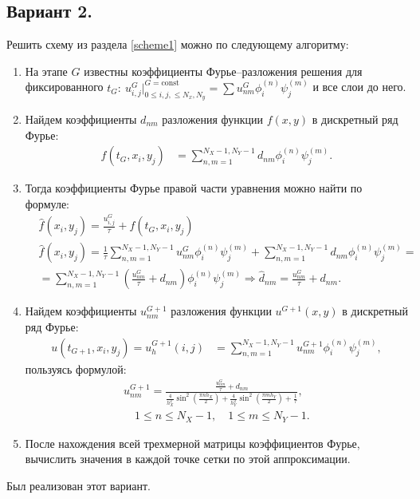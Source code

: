 \documentclass[14pt,a4paper]{extarticle}
\newcommand{\1}{\mathbbm{1}}
\begin{document}
\subsection{Вариант 2.}
Решить схему из раздела \ref{scheme1} можно по следующему алгоритму:
\begin{enumerate}
    \item На этапе $G$ известны коэффициенты Фурье--разложения решения для фиксированного $t_G: \ u_{i, j}^{G} \big|^{G = \text{const}} _{0 \leq i, j, \leq N_x, N_y} = \sum u_{nm}^G \phi ^{(n)}_i \psi ^{(m)}_j$ и все слои до него.
    \item Найдем коэффициенты $d_{nm}$ разложения функции $f(x, y)$ в дискретный ряд Фурье: 
    \begin{align*}
     f(t_G, x_i, y_j)  &= \sum_{n, m = 1}^{N_X-1, N_Y-1} d_{nm} \phi ^{(n)}_i \psi ^{(m)}_j.
    \end{align*}
    \item Тогда коэффициенты Фурье правой части уравнения можно найти по формуле:
    \begin{align*}
     &\hat f(x_i, y_j) = \frac{u^{G}_{i, j}}{\tau} + f(t_G, x_i, y_j) \\
     &\hat f(x_i, y_j) = \frac{1}{\tau} \sum_{n, m = 1}^{N_X-1, N_Y-1}u_{nm}^G \phi ^{(n)}_i \psi ^{(m)}_j  + \sum_{n, m = 1}^{N_X-1, N_Y-1} d_{nm} \phi ^{(n)}_i \psi ^{(m)}_j = \\
     &= \sum_{n, m = 1}^{N_X-1, N_Y-1} \left(\frac{u_{nm}^G}{\tau} + d_{nm}\right) \phi ^{(n)}_i \psi ^{(m)}_j \Rightarrow \hat d_{nm} = \frac{u_{nm}^G}{\tau} + d_{nm}.
    \end{align*}
    \item Найдем коэффициенты $u_{nm}^{G+1}$ разложения функции $u^{G+1}(x, y)$ в дискретный ряд Фурье: 
    \begin{align*}
    u(t_{G+1}, x_i, y_j) = u_h^{G+1}(i, j) &= \sum_{n, m = 1}^{N_X-1, N_Y-1} u_{nm}^{G+1} \phi ^{(n)}_i \psi ^{(m)}_j,
    \end{align*}
    пользуясь формулой:
    \begin{align*}
    u_{nm}^{G+1} = \frac{\frac{u_{nm}^G}{\tau} + d_{nm}}{\frac{4}{h_X^2} \sin ^2\left(\frac{\pi n h_X}{2}\right)
    +  \frac{4}{h_Y^2} \sin ^2\left(\frac{\pi m h_Y}{2}\right) + \frac{1}{\tau}}, \\
    \quad 1 \leq n \leq N_X-1, \quad 1 \leq m \leq N_Y-1.
    \end{align*}
    \item После нахождения всей трехмерной матрицы коэффициентов Фурье, вычислить значения в каждой точке сетки по этой аппроксимации. 
\end{enumerate}
Был реализован этот вариант.
\end{document}
